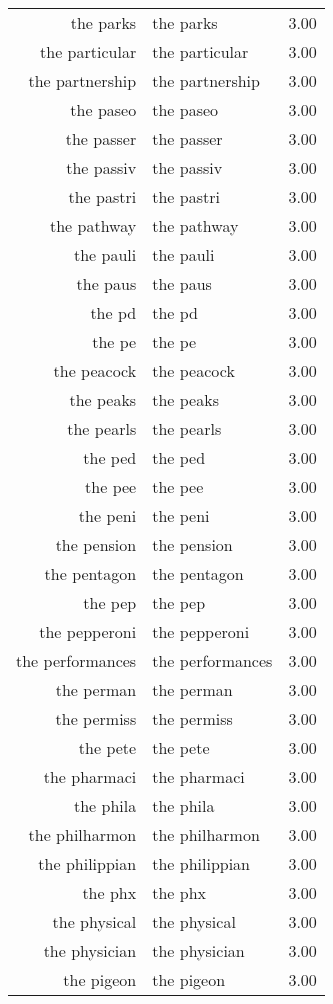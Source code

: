 \begin{table}[ht]
\begin{tabular}{rlr}
  the parks & the parks & 3.00 \\ 
  the particular & the particular & 3.00 \\ 
  the partnership & the partnership & 3.00 \\ 
  the paseo & the paseo & 3.00 \\ 
  the passer & the passer & 3.00 \\ 
  the passiv & the passiv & 3.00 \\ 
  the pastri & the pastri & 3.00 \\ 
  the pathway & the pathway & 3.00 \\ 
  the pauli & the pauli & 3.00 \\ 
  the paus & the paus & 3.00 \\ 
  the pd & the pd & 3.00 \\ 
  the pe & the pe & 3.00 \\ 
  the peacock & the peacock & 3.00 \\ 
  the peaks & the peaks & 3.00 \\ 
  the pearls & the pearls & 3.00 \\ 
  the ped & the ped & 3.00 \\ 
  the pee & the pee & 3.00 \\ 
  the peni & the peni & 3.00 \\ 
  the pension & the pension & 3.00 \\ 
  the pentagon & the pentagon & 3.00 \\ 
  the pep & the pep & 3.00 \\ 
  the pepperoni & the pepperoni & 3.00 \\ 
  the performances & the performances & 3.00 \\ 
  the perman & the perman & 3.00 \\ 
  the permiss & the permiss & 3.00 \\ 
  the pete & the pete & 3.00 \\ 
  the pharmaci & the pharmaci & 3.00 \\ 
  the phila & the phila & 3.00 \\ 
  the philharmon & the philharmon & 3.00 \\ 
  the philippian & the philippian & 3.00 \\ 
  the phx & the phx & 3.00 \\ 
  the physical & the physical & 3.00 \\ 
  the physician & the physician & 3.00 \\ 
  the pigeon & the pigeon & 3.00 \\ 

\end{tabular}
\end{table}
